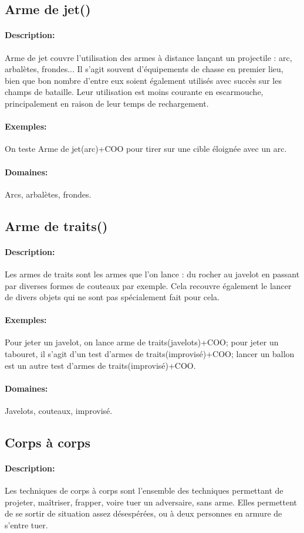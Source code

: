 \documentclass[10pt,a4paper,twocolumn]{book}
\begin{document}
\subsection{Arme de jet()}
\paragraph{Description:}Arme de jet couvre l'utilisation des armes à distance lançant un projectile : arc, arbalètes, frondes... Il s'agit souvent d'équipements de chasse en premier lieu, bien que bon nombre d'entre eux soient également utilisés avec succès sur les champs de bataille. Leur utilisation est moins courante en escarmouche, principalement en raison de leur temps de rechargement.
\paragraph{Exemples:}On teste Arme de jet(arc)+COO pour tirer sur une cible éloignée avec un arc. 
\paragraph{Domaines:}Arcs, arbalètes, frondes.
\subsection{Arme de traits()}
\paragraph{Description:}Les armes de traits sont les armes que l'on lance : du rocher au javelot en passant par diverses formes de couteaux par exemple. Cela recouvre également le lancer de divers objets qui ne sont pas spécialement fait pour cela.
\paragraph{Exemples:}Pour jeter un javelot, on lance arme de traits(javelots)+COO; pour jeter un tabouret, il s'agit d'un test d'armes de traits(improvisé)+COO; lancer un ballon est un autre test d'armes de traits(improvisé)+COO.
\paragraph{Domaines:}Javelots, couteaux, improvisé.
\subsection{Corps à  corps}
\paragraph{Description:}Les techniques de corps à corps sont l'ensemble des techniques permettant de projeter, maîtriser, frapper, voire tuer un adversaire, sans arme. Elles permettent de se sortir de situation assez désespérées, ou à deux personnes en armure de s'entre tuer.
\end{document}
